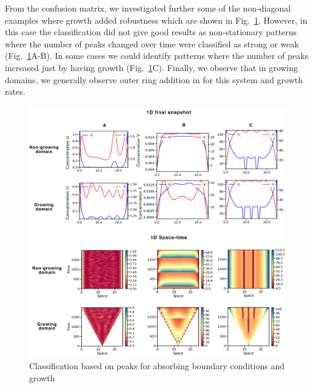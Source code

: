 From the confusion matrix, we investigated further some of the non-diagonal examples where growth added robustness which are shown in Fig.~\ref{fig:interesting_cases_edgegrowth2}.
 However, in this case the classification did not give good results as non-stationary patterns where the number of peaks changed over time were classified as strong or weak (Fig.~\ref{fig:interesting_cases_edgegrowth2}A-B).
In some cases we could identify patterns where the number of peaks increased just by having growth (Fig.~\ref{fig:interesting_cases_edgegrowth2}C).
Finally, we observe that in growing domains, we generally observe outer ring addition in for this system and growth rates.
\begin{figure}[H] %

    \centering
    \begin{adjustbox}{center}
        \includegraphics[width=1\textwidth]{chapters/Chapter 1/interesting_cases_edgegrowth2} %
    \end{adjustbox}
    \caption{Classification based on peaks for absorbing boundary conditions and growth}
    \label{fig:interesting_cases_edgegrowth2} %
\end{figure}

